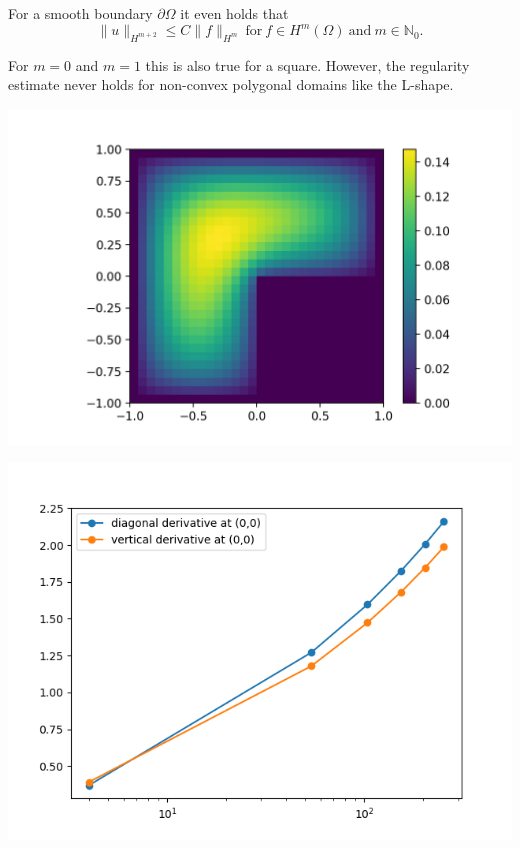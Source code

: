 \documentclass[pagesize]{scrartcl}
\begin{document}
For a smooth boundary $\partial \Omega$ it even holds that \begin{equation*}
	\|u\|_{H^{m+2}} \leq C \|f\|_{H^m} \ \text{for} \ f \in  H^m(\Omega) \ \text{and} \ m \in \mathbb{N}_0.
\end{equation*}


For $m=0$ and $m=1$ this is also true for a square. However, the regularity estimate never holds for non-convex polygonal domains like the L-shape.\\[0.5ex]

\begin{minipage}{0.4\textwidth}
	\includegraphics[scale=0.4]{sol37.png}
\end{minipage}
\begin{minipage}{0.5\textwidth}
	\includegraphics[scale=0.4]{derivatives2.png}
\end{minipage}
\end{document}
